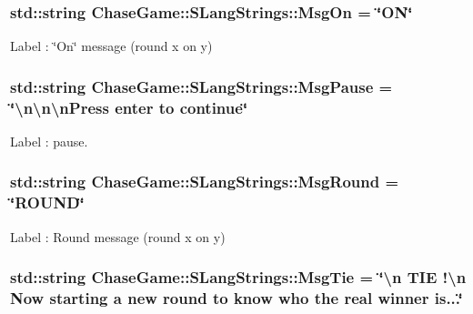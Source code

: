 \hypertarget{struct_chase_game_1_1_s_lang_strings_af30da50d583af601645117d472aace34}{
\subsubsection[{Msg\-On}]{\setlength{\rightskip}{0pt plus 5cm}std\-::string Chase\-Game\-::\-S\-Lang\-Strings\-::\-Msg\-On = \char`\"{}O\-N\char`\"{}}}\label{struct_chase_game_1_1_s_lang_strings_af30da50d583af601645117d472aace34}


Label \-: \char`\"{}\-On\char`\"{} message (round x on y) 

\hypertarget{struct_chase_game_1_1_s_lang_strings_ad8e029116bf5c6ad81dd7e116195d5cc}{
\subsubsection[{Msg\-Pause}]{\setlength{\rightskip}{0pt plus 5cm}std\-::string Chase\-Game\-::\-S\-Lang\-Strings\-::\-Msg\-Pause = \char`\"{}\textbackslash{}n\textbackslash{}n\textbackslash{}n\-Press enter to continue\char`\"{}}}\label{struct_chase_game_1_1_s_lang_strings_ad8e029116bf5c6ad81dd7e116195d5cc}


Label \-: pause. 

\hypertarget{struct_chase_game_1_1_s_lang_strings_a637a94fa33b573cec57d98e6855c823f}{
\subsubsection[{Msg\-Round}]{\setlength{\rightskip}{0pt plus 5cm}std\-::string Chase\-Game\-::\-S\-Lang\-Strings\-::\-Msg\-Round = \char`\"{}R\-O\-U\-N\-D\char`\"{}}}\label{struct_chase_game_1_1_s_lang_strings_a637a94fa33b573cec57d98e6855c823f}


Label \-: Round message (round x on y) 

\hypertarget{struct_chase_game_1_1_s_lang_strings_aedfc3595110c1d1da944d4ca35fc1510}{
\subsubsection[{Msg\-Tie}]{\setlength{\rightskip}{0pt plus 5cm}std\-::string Chase\-Game\-::\-S\-Lang\-Strings\-::\-Msg\-Tie = \char`\"{}\textbackslash{}n T\-I\-E !\textbackslash{}n Now starting a new round to know who the real winner is...\char`\"{}}}\label{struct_chase_game_1_1_s_lang_strings_aedfc3595110c1d1da944d4ca35fc1510}


